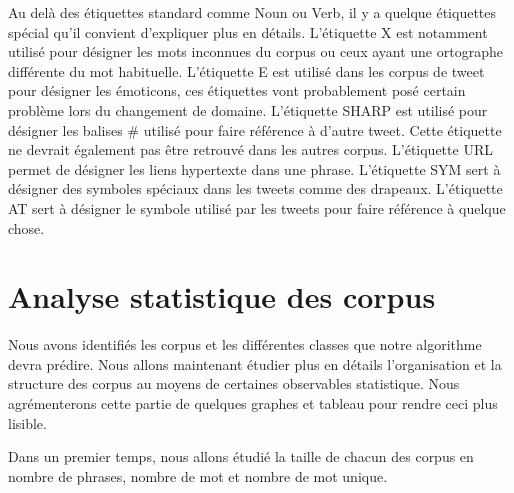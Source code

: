 \documentclass[french, 14pt]{memoir}
\begin{document}
 Au delà des étiquettes standard comme Noun ou Verb, il y a quelque étiquettes spécial qu'il convient d'expliquer plus en détails. L'étiquette X est notamment utilisé pour désigner les mots inconnues du corpus ou ceux ayant une ortographe différente du mot habituelle. L'étiquette E est utilisé dans les corpus de tweet pour désigner les émoticons, ces étiquettes vont probablement posé certain problème lors du changement de domaine. L'étiquette SHARP est utilisé pour désigner les balises \# utilisé pour faire référence à d'autre tweet. Cette étiquette ne devrait également pas être retrouvé dans les autres corpus. L'étiquette URL permet de désigner les liens hypertexte dans une phrase. L'étiquette SYM sert à désigner des symboles spéciaux dans les tweets comme des drapeaux. L'étiquette AT sert à désigner le symbole \@ utilisé par les tweets pour faire référence à quelque chose.
 
\section{Analyse statistique des corpus}

Nous avons identifiés les corpus et les différentes classes que notre algorithme devra prédire. Nous allons maintenant étudier plus en détails l'organisation et la structure des corpus au moyens de certaines observables statistique. Nous agrémenterons cette partie de quelques graphes et tableau pour rendre ceci plus lisible.

Dans un premier temps, nous allons étudié la taille de chacun des corpus en nombre de phrases, nombre de mot et nombre de mot unique.
\end{document}
